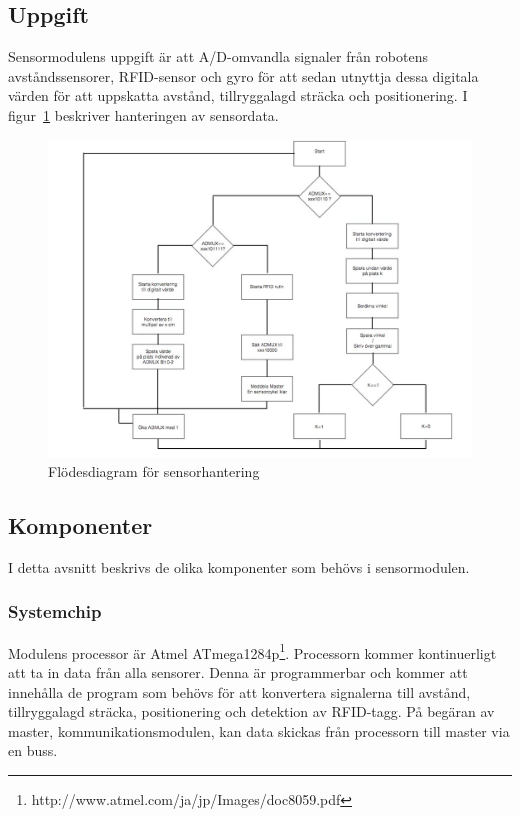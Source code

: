 \documentclass[a4paper,12pt,fleqn]{article}
\begin{document}
\subsection{Uppgift}
Sensormodulens uppgift är att A/D-omvandla signaler från robotens avståndssensorer, RFID-sensor och gyro för att sedan utnyttja dessa digitala värden för att uppskatta avstånd, tillryggalagd sträcka och positionering. I figur~\ref{fig:sensorflow} beskriver hanteringen av sensordata.

\begin{figure}[htp] %
  \begin{center}
  \includegraphics[keepaspectratio=true,width=\linewidth]{sensorflode}  %
  \end{center}
  \caption{Flödesdiagram för sensorhantering} %
  \label{fig:sensorflow}
\end{figure}

\subsection{Komponenter}
I detta avsnitt beskrivs de olika komponenter som behövs i sensormodulen.

\subsubsection{Systemchip}
Modulens processor är Atmel ATmega1284p\footnote{http://www.atmel.com/ja/jp/Images/doc8059.pdf}. Processorn kommer kontinuerligt att ta in data från alla sensorer. Denna är programmerbar och kommer att innehålla de program som behövs för att konvertera signalerna till avstånd, tillryggalagd sträcka, positionering och detektion av RFID-tagg. På begäran av master, kommunikationsmodulen, kan data skickas från processorn till master via en buss.
\end{document}
